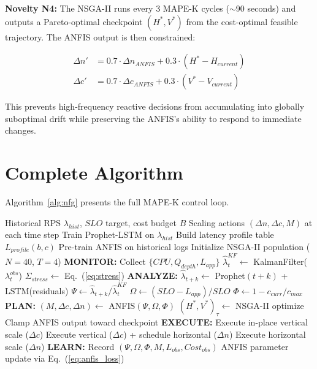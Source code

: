 \documentclass[conference]{IEEEtran}
\begin{document}
\textbf{Novelty N4:} The NSGA-II runs every 3 MAPE-K cycles ($\sim$90 seconds) and outputs a Pareto-optimal checkpoint $(H^*, V^*)$ from the cost-optimal feasible trajectory. The ANFIS output is then constrained:

\begin{align}
\Delta n' &= 0.7 \cdot \Delta n_{ANFIS} + 0.3 \cdot (H^* - H_{current}) \\
\Delta c' &= 0.7 \cdot \Delta c_{ANFIS} + 0.3 \cdot (V^* - V_{current})
\end{align}

This prevents high-frequency reactive decisions from accumulating into globally suboptimal drift while preserving the ANFIS's ability to respond to immediate changes.

\section{Complete Algorithm}
\label{sec:algorithm}

Algorithm~\ref{alg:nfg} presents the full MAPE-K control loop.

\begin{algorithm}[t]
\caption{NFG-DiagScale Control Loop}
\label{alg:nfg}
\begin{algorithmic}[1]
\REQUIRE Historical RPS $\lambda_{hist}$, $SLO$ target, cost budget $B$
\ENSURE Scaling actions $(\Delta n, \Delta c, M)$ at each time step
\STATE Train Prophet-LSTM on $\lambda_{hist}$
\STATE Build latency profile table $L_{profile}(b,c)$
\STATE Pre-train ANFIS on historical logs
\STATE Initialize NSGA-II population ($N=40$, $T=4$)
\STATE \textbf{MONITOR:} Collect $\{CPU, Q_{depth}, L_{app}\}$
\STATE $\hat{\lambda}^{KF}_t \leftarrow$ KalmanFilter($\lambda^{obs}_t$)
\STATE $\Sigma_{stress} \leftarrow$ Eq.~(\ref{eq:stress})
\STATE \textbf{ANALYZE:}
\STATE $\hat{\lambda}_{t+k} \leftarrow$ Prophet$(t\!+\!k)$ + LSTM(residuals)
\STATE $\Psi \leftarrow \hat{\lambda}_{t+k} / \hat{\lambda}^{KF}_t$
\STATE $\Omega \leftarrow (SLO - L_{app}) / SLO$
\STATE $\Phi \leftarrow 1 - c_{curr} / c_{max}$
\STATE \textbf{PLAN:}
\STATE $(M, \Delta c, \Delta n) \leftarrow$ ANFIS$(\Psi, \Omega, \Phi)$
\STATE $(H^*, V^*)_{\tau} \leftarrow$ NSGA-II optimize
\STATE Clamp ANFIS output toward checkpoint
\ENDIF
\STATE \textbf{EXECUTE:}
\STATE Execute in-place vertical scale ($\Delta c$)
\STATE Execute vertical ($\Delta c$) + schedule horizontal ($\Delta n$)
\STATE Execute horizontal scale ($\Delta n$)
\ENDIF
\STATE \textbf{LEARN:} Record $(\Psi, \Omega, \Phi, M, L_{obs}, Cost_{obs})$
\STATE ANFIS parameter update via Eq.~(\ref{eq:anfis_loss})
\ENDIF
\ENDFOR
\end{algorithmic}
\end{algorithm}
\end{document}
